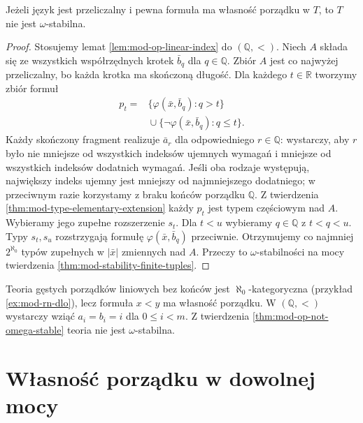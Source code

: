 \begin{twierdzenie}
\label{thm:mod-op-not-omega-stable}
Jeżeli język jest przeliczalny i pewna formuła
ma własność porządku w $T$, to $T$ nie jest
$\omega$-stabilna.
\end{twierdzenie}
\begin{proof}
Stosujemy lemat \ref{lem:mod-op-linear-index}
do $(\mathbb Q,<)$. Niech $A$ składa się ze
wszystkich współrzędnych krotek $\bar b_q$
dla $q\in\mathbb Q$. Zbiór $A$ jest co najwyżej
przeliczalny, bo każda krotka ma skończoną długość.
Dla każdego $t\in\mathbb R$ tworzymy zbiór formuł
\[
\begin{aligned}
p_t={}&\{\varphi(\bar x,\bar b_q):q>t\}\\
 &{}\cup\{\neg\varphi(\bar x,\bar b_q):q\leq t\}.
\end{aligned}
\]
Każdy skończony fragment realizuje $\bar a_r$
dla odpowiedniego $r\in\mathbb Q$: wystarczy,
aby $r$ było nie mniejsze od wszystkich
indeksów ujemnych wymagań i mniejsze od
wszystkich indeksów dodatnich wymagań.
Jeśli oba rodzaje występują, największy
indeks ujemny jest mniejszy od najmniejszego
dodatniego; w przeciwnym razie korzystamy
z braku końców porządku $\mathbb Q$.
Z twierdzenia \ref{thm:mod-type-elementary-extension}
każdy $p_t$ jest typem częściowym nad $A$.
Wybieramy jego zupełne rozszerzenie $s_t$.
Dla $t<u$ wybieramy $q\in\mathbb Q$ z $t<q<u$.
Typy $s_t,s_u$ rozstrzygają formułę
$\varphi(\bar x,\bar b_q)$ przeciwnie.
Otrzymujemy co najmniej $2^{\aleph_0}$ typów
zupełnych w $|\bar x|$ zmiennych nad $A$.
Przeczy to $\omega$-stabilności na mocy
twierdzenia \ref{thm:mod-stability-finite-tuples}.
\end{proof}

\begin{przyklad}
\label{ex:mod-dlo-not-omega-stable}
Teoria gęstych porządków liniowych bez końców
jest $\aleph_0$-kategoryczna (przykład
\ref{ex:mod-rn-dlo}), lecz formuła $x<y$
ma własność porządku. W $(\mathbb Q,<)$
wystarczy wziąć $a_i=b_i=i$ dla $0\leq i<m$.
Z twierdzenia \ref{thm:mod-op-not-omega-stable}
teoria nie jest $\omega$-stabilna.
\end{przyklad}

\section{Własność porządku w dowolnej mocy}

